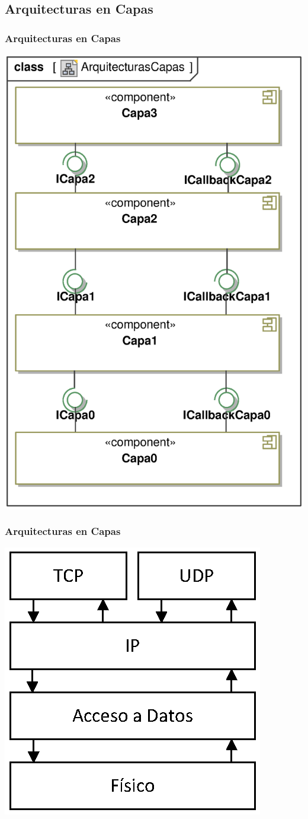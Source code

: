 ﻿\documentclass[handout,a4paper,slidestop,xcolor=pst,blue]{beamer}
\begin{document}
\subsection{Arquitecturas en Capas}

\begin{frame}[c]
	\frametitle{Arquitecturas en Capas}
	\begin{center}
		\includegraphics[width=.40\linewidth,keepaspectratio=true]{images/patterns/layered00.eps}
	\end{center}
\end{frame}

\begin{frame}[c]
	\frametitle{Arquitecturas en Capas}
	\begin{center}
		\includegraphics[width=.5\linewidth,keepaspectratio=true]{images/patterns/layered01.eps}
	\end{center}
\end{frame}

\end{document}
